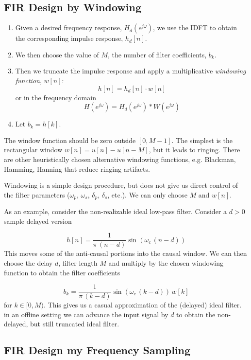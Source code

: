 \documentclass{article}
\begin{document}
\subsection{FIR Design by Windowing}

\begin{enumerate}
\item Given a desired frequency response, $H_d\left(e^{j\omega} \right)$, we use the IDFT to obtain the corresponding impulse response, $h_d[n]$.
\item We then choose the value of $M$, the number of filter coefficients, $b_k$.
\item Then we truncate the impulse response and apply a multiplicative \textit{windowing function}, $w[n]$:
  \[
  h[n] = h_d[n] \cdot w[n]
  \]
  or in the frequency domain
  \[
  H\left(e^{j\omega} \right) = H_d\left(e^{j\omega} \right) * W\left(e^{j\omega} \right)
  \]
\item Let $b_k = h[k]$.
\end{enumerate}

The window function should be zero outside $[0, M-1]$. The simplest is the rectangular window $w[n] = u[n] - u[n-M]$, but it leads to ringing. There are other heuristically chosen alternative windowing functions, e.g. Blackman, Hamming, Hanning that reduce ringing artifacts.

Windowing is a simple design procedure, but does not give us direct control of the filter parameters ($\omega_p$, $\omega_s$, $\delta_p$, $\delta_s$, etc.). We can only choose $M$ and $w[n]$.

As an example, consider the non-realizable ideal low-pass filter. Consider a $d> 0$ sample delayed version

\[
h[n] = \frac{1}{\pi\, (n-d)} \sin(\omega_c\, (n-d))
\]
This moves some of the anti-causal portions into the causal window. We can then choose the delay $d$, filter length $M$ and multiply by the chosen windowing function to obtain the filter coefficients

\[
b_k = \frac{1}{\pi\, (k-d)} \sin(\omega_c\, (k-d))\, w[k]
\]
for $k\in [0,M)$. This gives us a casual approximation of the (delayed) ideal filter. in an offline setting we can advance the input signal by $d$ to obtain the non-delayed, but still truncated ideal filter.
  
\subsection{FIR Design my Frequency Sampling}
\end{document}

